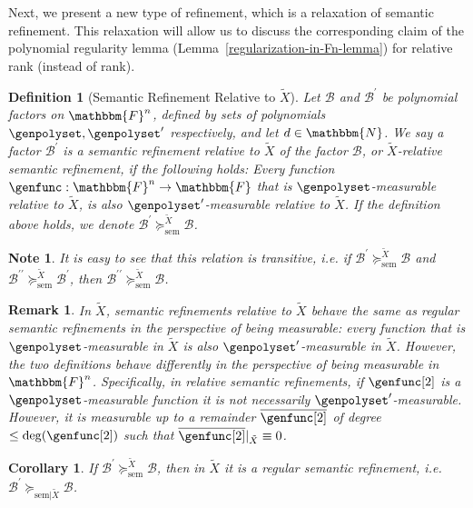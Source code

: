 \documentclass[10pt,a4paper]{article}
\newtheorem{definition}[theorem]{Definition}
\newtheorem{corollary}[theorem]{Corollary}
\newtheorem{remark}[theorem]{Remark}
\newtheorem*{note*}{Note}
\newcommand{\basefield}[0]{\mathbbm{F}}
\newcommand{\blocklength}[0]{n}
\newcommand{\field}[0]{\basefield^{\blocklength}}
\newcommand{\degree}[0]{d}
\newcommand{\funcdef}[3]{#1:#2\rightarrow#3}
\newcommand{\restrictfunc}[2]{#1|_{#2}}
\newcommand{\factor}[0]{\mathcal{B}}
\newcommand{\semrefineex}[1]{\succeq_{\text{sem}|#1}}
\newcommand{\relsemrefineex}[1]{\succeq^{#1}_{\text{sem}}}
\newcommand{\naturalnumbersset}[0]{\mathbbm{N}}
\newcommand{\relativeremainder}[1]{\overline{#1}}
\newcommand{\variety}{{\tilde{X}}}
\begin{document}
Next, we present a new type of refinement, which is a relaxation of semantic refinement.
This relaxation will allow us to discuss the corresponding claim of the polynomial regularity lemma (Lemma~\ref{regularization-in-Fn-lemma}) for relative rank (instead of rank).
\begin{definition}[Semantic Refinement Relative to $\variety$]
    Let $\factor$ and $\factor^\prime$ be polynomial factors on $\field$, defined by sets of polynomials $\genpolyset, \genpolyset^{\prime}$ respectively,
    and let $\degree \in \naturalnumbersset$.
    We say a factor $\factor^\prime$ is a \emph{semantic refinement relative to $\variety$} of the factor $\factor$,
    or \emph{$\variety$-relative semantic refinement},
    if the following holds:
    Every function $\funcdef{\genfunc}{\field}{\basefield}$ that is $\genpolyset$-measurable relative to $\variety$,
    is also $\genpolyset^{\prime}$-measurable relative to $\variety$.
    If the definition above holds, we denote $\factor^{\prime} \relsemrefineex{\variety} \factor$.
\end{definition}
\begin{note*}
    It is easy to see that this relation is transitive, i.e. if
    $\factor^{\prime} \relsemrefineex{\variety} \factor$ and
    $\factor^{\prime\prime} \relsemrefineex{\variety} \factor^{\prime}$,
    then $\factor^{\prime\prime} \relsemrefineex{\variety} \factor$.
\end{note*}
\begin{remark}
    In $\variety$, semantic refinements relative to $\variety$ behave the same as regular semantic refinements in the perspective of being measurable:
    every function that is $\genpolyset$-measurable in $\variety$ is also $\genpolyset^{\prime}$-measurable in $\variety$.
    However, the two definitions behave differently in the perspective of being measurable in $\field$.
    Specifically, in relative semantic refinements,
    if $\genfunc[2]$ is a $\genpolyset$-measurable function it is not necessarily $\genpolyset^{\prime}$-measurable.
    However, it is measurable up to a remainder $\relativeremainder{\genfunc[2]}$ of degree $\leq \deg(\genfunc[2])$ such that $\restrictfunc{\relativeremainder{\genfunc[2]}}{\variety} \equiv 0$.
\end{remark}
\begin{corollary}\label{relative-semantic-refinement-is-restricted-semantic-refinement}
    If $\factor^{\prime} \relsemrefineex{\variety} \factor$, then in $\variety$ it is a regular semantic refinement, i.e. $\factor^{\prime} \semrefineex{\variety} \factor$.
\end{corollary}
\end{document}
